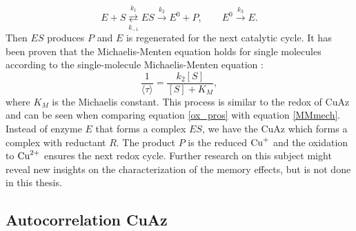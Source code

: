 \documentclass[twoside,single]{lion-msc}
\begin{document}
\begin{equation}\label{MMmech}
E + S \overset{k_{1}}{\underset{k_{-1}}\rightleftarrows} ES \overset{k_{2}}\rightarrow E^{0} + P,  \qquad E^{0} \overset{k_{3}}\rightarrow E.
\end{equation}
Then $ES$ produces $P$ and $E$ is regenerated for the next catalytic cycle. It has been proven that the Michaelis-Menten equation holds for single molecules according to the single-molecule Michaelis-Menten equation \cite{English2006}:
\begin{equation}\label{MMmech1}
\frac{1}{\langle \tau \rangle} = \frac{k_{2}[S]}{[S]+K_{M}},
\end{equation}
 where $K_{M}$ is the Michaelis constant. This process is similar to the redox of CuAz and can be seen when comparing equation \ref{ox_pros} with equation \ref{MMmech}. Instead of enzyme $E$ that forms a complex $ES$, we have the CuAz which forms a complex with reductant $R$. The product $P$ is the reduced $\textup{Cu}^{+}$ and the oxidation to $\textup{Cu}^{2+}$ ensures the next redox cycle. Further research on this subject might reveal new insights on the characterization of the memory effects, but is not done in this thesis.

\subsection{Autocorrelation CuAz} \label{autocor}
\end{document}
